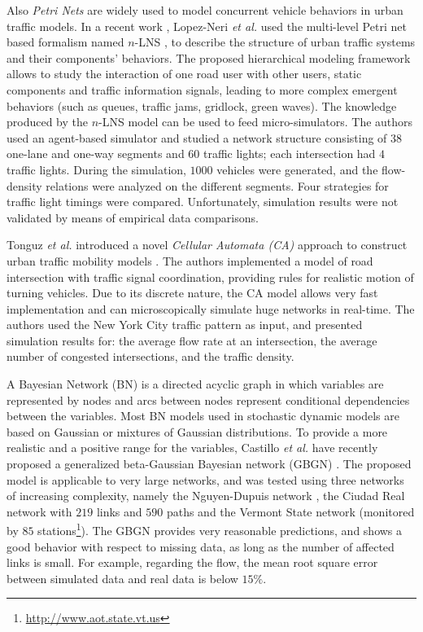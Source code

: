 \documentclass[10pt,onecolumn]{article}
\begin{document}
Also \textit{Petri Nets} are widely used to model concurrent vehicle behaviors in urban traffic models. 
In a recent work \cite{LopezNeri2010}, Lopez-Neri \textit{et al.} used the multi-level Petri net based formalism named $n$-LNS \cite{SanchezHerrera2004}, to describe the structure of urban traffic systems and their components' behaviors. 
The proposed hierarchical modeling framework allows to study the interaction of one road user with other users, static components and traffic information signals, leading to more complex emergent behaviors (such as queues, traffic jams, gridlock, green waves). The knowledge produced by the $n$-LNS model can be used to feed micro-simulators. The authors used an agent-based simulator and studied a network structure consisting of $38$ one-lane and one-way segments and $60$ traffic lights; each intersection had $4$ traffic lights. 
During the simulation, $1000$ vehicles were generated, and the flow-density relations were analyzed on the different segments. Four strategies for traffic light timings were compared. Unfortunately, simulation results were not validated by means of empirical data comparisons. 

Tonguz \textit{et al.} introduced a novel \textit{Cellular Automata (CA)} approach to construct urban traffic mobility models \cite{Tonguz2009}. The authors implemented a model of road intersection with traffic signal coordination, providing rules for realistic motion of turning vehicles. Due to its discrete nature, the CA model allows very fast implementation and can microscopically simulate huge networks in real-time. The authors used the New York City traffic pattern as input, and presented simulation results for: the average flow rate at an intersection, the average number of congested intersections, and the traffic density.

A Bayesian Network (BN) is a directed acyclic graph in which variables are represented by nodes and arcs between nodes represent conditional dependencies between the variables.
Most BN models used in stochastic dynamic models are based on Gaussian or mixtures of Gaussian distributions. To provide a more realistic and a positive range for the variables, Castillo \textit{et al.} have recently proposed a generalized beta-Gaussian Bayesian network (GBGN) \cite{Castillo2012}. 
The proposed model is applicable to very large networks, and was tested using three networks of increasing complexity, namely the Nguyen-Dupuis network \cite{Nguyen1984}, the Ciudad Real network with $219$ links and $590$ paths and the Vermont State network (monitored by $85$ stations\footnote{\url{http://www.aot.state.vt.us}}). 
The GBGN provides very reasonable predictions, and shows a good behavior with respect to missing data, as long as the number of affected links is small. For example, regarding the flow, the mean root square error between simulated data and real data is below $15\%$.
\end{document}
